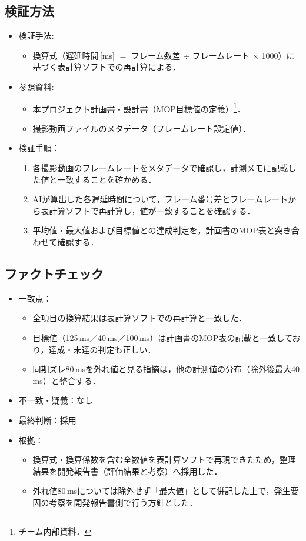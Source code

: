 \documentclass[lualatex,paper=a4paper,jafontsize=11.5pt,jafontscale=1.05]{jlreq}
\begin{document}
\subsection{検証方法}
\begin{itemize}
  \item 検証手法:
  \begin{itemize}
      \item 換算式（遅延時間\,[ms] $=$ フレーム数差 $\div$ フレームレート $\times$ 1000）に基づく表計算ソフトでの再計算による．
  \end{itemize}
  \item 参照資料:
  \begin{itemize}
      \item 本プロジェクト計画書・設計書（MOP目標値の定義）\footnote{チーム内部資料．}．
      \item 撮影動画ファイルのメタデータ（フレームレート設定値）．
  \end{itemize}
  \item 検証手順：
  \begin{enumerate}
      \item 各撮影動画のフレームレートをメタデータで確認し，計測メモに記載した値と一致することを確かめる．
      \item AIが算出した各遅延時間について，フレーム番号差とフレームレートから表計算ソフトで再計算し，値が一致することを確認する．
      \item 平均値・最大値および目標値との達成判定を，計画書のMOP表と突き合わせて確認する．
  \end{enumerate}
\end{itemize}

\subsection{ファクトチェック}
\begin{itemize}
  \item 一致点：
  \begin{itemize}
    \item 全項目の換算結果は表計算ソフトでの再計算と一致した．
    \item 目標値（125\,ms／40\,ms／100\,ms）は計画書のMOP表の記載と一致しており，達成・未達の判定も正しい．
    \item 同期ズレ80\,msを外れ値と見る指摘は，他の計測値の分布（除外後最大40\,ms）と整合する．
  \end{itemize}
  \item 不一致・疑義：なし
  \item 最終判断：採用
  \item 根拠：
  \begin{itemize}
    \item 換算式・換算係数を含む全数値を表計算ソフトで再現できたため，整理結果を開発報告書（評価結果と考察）へ採用した．
    \item 外れ値80\,msについては除外せず「最大値」として併記した上で，発生要因の考察を開発報告書側で行う方針とした．
  \end{itemize}
\end{itemize}
\end{document}
